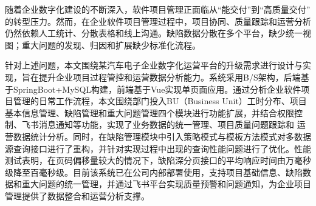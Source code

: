 随着企业数字化建设的不断深入，软件项目管理正面临从“能交付”到“高质量交付” 的转型压力。然而，在企业软件项目管理过程中，项目协同、质量跟踪和运营分析仍然依赖人工统计、分散表格和线上沟通。缺陷数据分散在多个平台，缺少统一视图；重大问题的发现、归因和扩展缺少标准化流程。

针对上述问题，本文围绕某汽车电子企业数字化运营平台的升级需求进行设计与实现，旨在提升企业项目过程管控和运营数据分析能力。系统采用B/S架构，后端基于SpringBoot+MySQL构建，前端基于Vue实现单页面应用。通过分析企业软件项目管理的日常工作流程，本文围绕部门投入BU（Business Unit）工时分布、项目基本信息管理、缺陷管理和重大问题管理四个模块进行功能扩展，并结合权限控制、飞书消息通知等功能，实现了业务数据的统一管理、项目质量问题跟踪和 运营数据统计分析。同时，在缺陷管理模块中引入策略模式与模板方法模式对多数据源查询接口进行了重构，并针对实现过程中出现的查询性能问题进行了优化。性能测试表明，在页码偏移量较大的情况下，缺陷深分页接口的平均响应时间由万毫秒级降至百毫秒级。目前该系统已在公司内部部署使用，支持项目基础信息、缺陷数据和重大问题的统一管理，并通过飞书平台实现质量预警和问题通知，为企业项目管理提供了数据整合和运营分析支撑。
